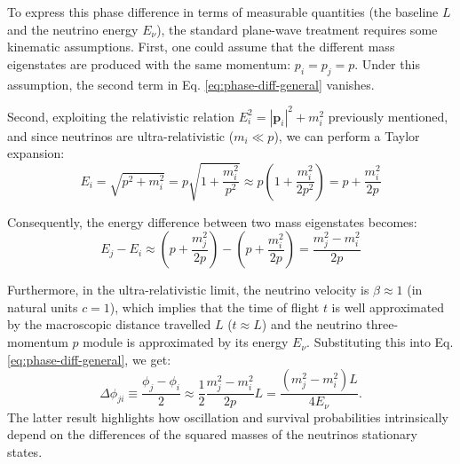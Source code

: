 To express this phase difference in terms of measurable quantities (the baseline $L$ and the neutrino energy $E_\nu$), the standard plane-wave treatment requires some kinematic assumptions. First, one could assume that the different mass eigenstates are produced with the same momentum: $p_i = p_j = p$. Under this assumption, the second term in Eq. \ref{eq:phase-diff-general} vanishes.

Second, exploiting the relativistic relation $E_i^2 = |\mathbf{p}_i|^2 + m_i^2$ previously mentioned, and since neutrinos are ultra-relativistic 
($m_i \ll p$), we can perform a Taylor expansion:
\begin{equation}
    \label{eq:energy-taylor}
    E_i = \sqrt{p^2 + m_i^2} = p\sqrt{1 + \frac{m_i^2}{p^2}} \approx p \left( 1 + \frac{m_i^2}{2p^2} \right) = p + \frac{m_i^2}{2p}
\end{equation}

Consequently, the energy difference between two mass eigenstates becomes:
\begin{equation}
    \label{eq:energy-diff}
    E_j - E_i \approx \left( p + \frac{m_j^2}{2p} \right) - \left( p + \frac{m_i^2}{2p} \right) = \frac{m_j^2 - m_i^2}{2p}
\end{equation}

Furthermore, in the ultra-relativistic limit, the neutrino velocity is $\beta \approx 1$ (in natural units $c=1$), 
which implies that the time of flight $t$ is well approximated by the macroscopic distance travelled $L$ ($t \approx L$) 
and the neutrino three-momentum $p$ module is approximated by its energy $E_\nu$. 
Substituting this into Eq. \ref{eq:phase-diff-general}, we get:
\begin{equation}
    \label{eq:phase-diff-approx1}
    \Delta\phi_{ji} \equiv \frac{\phi_j - \phi_i}{2} \approx \frac{1}{2}\frac{m_j^2 - m_i^2}{2p}L = \frac{(m_j^2 - m_i^2)L}{4E_\nu}.
\end{equation}
The latter result highlights how oscillation and survival probabilities intrinsically depend on the differences of the squared masses of the neutrinos stationary states.